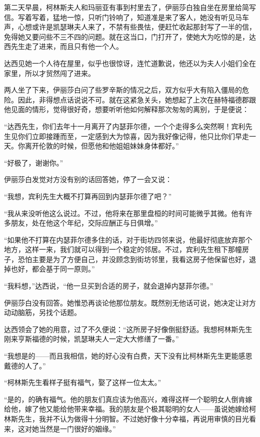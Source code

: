 \par 第二天早晨，柯林斯夫人和玛丽亚有事到村里去了，伊丽莎白独自坐在房里给简写信。写着写着，猛地一惊，只听门铃响了，知道准是来了客人，她没有听见马车声，心想或许是凯瑟琳夫人来了，不禁有些畏怯，便赶忙收起那封写了一半的信，免得她又要问些不三不四的问题。就在这当口，门打开了，使她大为吃惊的是，达西先生走了进来，而且只有他一个人。
\par 达西见她一个人待在屋里，似乎也很惊讶，连忙道歉说，他还以为夫人小姐们全在家里，所以才贸然闯了进来。
\par 两人坐了下来，伊丽莎白问了些罗辛斯的情况之后，双方似乎大有陷入僵局的危险。因此，非得想点话说说不可。就在这紧急关头，她想起了上次在赫特福德郡跟他见面的情形，觉得很好奇，想要听听他如何解释那次匆匆的离别，于是便说：
\par “达西先生，你们去年十一月离开了内瑟菲尔德，一个个走得多么突然啊！宾利先生见你们立即接踵而至，一定感到大为惊喜，因为我好像记得，他只比你们早走一天。你离开伦敦的时候，但愿他和他姐姐妹妹身体都好。”
\par “好极了，谢谢你。”
\par 伊丽莎白发觉对方没有别的话回答她，停了一会又说：
\par “我想，宾利先生大概不打算再回到内瑟菲尔德了吧？”
\par “我从来没听他这么说过。不过，他将来在那里盘桓的时间可能微乎其微。他有许多朋友，处在他这个年纪，交际应酬正与日俱增。”
\par “如果他不打算在内瑟菲尔德多住的话，对于街坊四邻来说，他最好彻底放弃那个地方，这样一来，我们就可以得到一个稳定的邻居。不过，宾利先生租下那幢房子，恐怕主要是为了方便自己，并没顾念到街坊邻里，我看这房子他保留也好，退掉也好，都会基于同一原则。”
\par “我料想，”达西说，“他一旦买到合适的房子，就会退掉内瑟菲尔德。”
\par 伊丽莎白没有回答。她惟恐再谈论他那位朋友。既然别无他话可说，她决定让对方动动脑筋，另找个话题。
\par 达西领会了她的用意，过了不久便说：“这所房子好像倒挺舒适。我想柯林斯先生刚来亨斯福德的时候，凯瑟琳夫人一定大大修缮了一番。”
\par “我想是的——而且我相信，她的好心没有白费，天下没有比柯林斯先生更能感恩戴德的人了。”
\par “柯林斯先生看样子挺有福气，娶了这样一位太太。”
\par “是的，的确有福气。他的朋友们真应该为他高兴，难得这样一个聪明女人倒肯嫁给他，嫁了他又能给他带来幸福。我的朋友是个极其聪明的女人——虽说她嫁给柯林斯先生，我并不认为做得十分明智。不过她好像十分幸福，再说用审慎的目光看来，这对她当然是一门很好的姻缘。”
